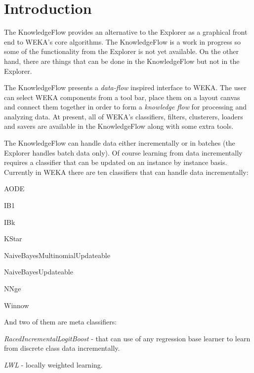 

\section{Introduction}

The KnowledgeFlow provides an alternative to the Explorer as a
graphical front end to WEKA's core algorithms. The KnowledgeFlow is a
work in progress so some of the functionality from the Explorer is not
yet available. On the other hand, there are things that can be done in
the KnowledgeFlow but not in the Explorer.

\begin{center}
\end{center}

The KnowledgeFlow presents a \textit{data-flow} inspired interface to
WEKA. The user can select WEKA components from a tool bar, place them
on a layout canvas and connect them together in order to form a
\textit{knowledge flow} for processing and analyzing data. At present, all of
WEKA's classifiers, filters, clusterers, loaders and savers are
available in the KnowledgeFlow along with some extra tools.

The KnowledgeFlow can handle data either incrementally or in batches
(the Explorer handles batch data only). Of course learning from data
incrementally requires a classifier that can be updated on an instance
by instance basis. Currently in WEKA there are ten classifiers that
can handle data incrementally:
\begin{tight_itemize}
	\item AODE
	\item IB1
	\item IBk
	\item KStar
	\item NaiveBayesMultinomialUpdateable
	\item NaiveBayesUpdateable
	\item NNge
	\item Winnow
\end{tight_itemize}

\noindent And two of them are meta classifiers:
\begin{tight_itemize}
	\item \textit{RacedIncrementalLogitBoost} - that can use of any regression base
learner to learn from discrete class data incrementally.
	\item \textit{LWL} - locally weighted learning.
\end{tight_itemize}

